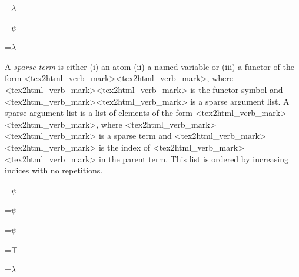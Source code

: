 \pagestyle{empty}
{\newpage
\clearpage
\samepage \setbox\sizebox=\hbox{$\lambda$}\box\sizebox
}

{\newpage
\clearpage
\samepage \setbox\sizebox=\hbox{$\psi$}\box\sizebox
}

{\newpage
\clearpage
\samepage \setbox\sizebox=\hbox{$\lambda$}\box\sizebox
}

{\newpage
\clearpage
\samepage \begin{definition}A {\em sparse term} is either
(i) an atom
(ii) a named variable
or (iii) a functor of the form <tex2html_verb_mark><tex2html_verb_mark>, where <tex2html_verb_mark><tex2html_verb_mark> is the functor symbol and <tex2html_verb_mark><tex2html_verb_mark> is a sparse argument list.
A sparse argument list is a list of elements of the form <tex2html_verb_mark><tex2html_verb_mark>, where <tex2html_verb_mark><tex2html_verb_mark> is a sparse term and <tex2html_verb_mark><tex2html_verb_mark> is the index of <tex2html_verb_mark><tex2html_verb_mark> in the parent term. 
This list is ordered by increasing indices with no repetitions.
\end{definition}
}

{\newpage
\clearpage
\samepage \setbox\sizebox=\hbox{$\psi$}\box\sizebox
}

{\newpage
\clearpage
\samepage \setbox\sizebox=\hbox{$\psi$}\box\sizebox
}

{\newpage
\clearpage
\samepage \setbox\sizebox=\hbox{$\psi$}\box\sizebox
}

{\newpage
\clearpage
\samepage \setbox\sizebox=\hbox{$\top$}\box\sizebox
}

{\newpage
\clearpage
\samepage \setbox\sizebox=\hbox{$\lambda$}\box\sizebox
}



